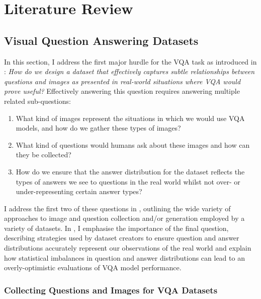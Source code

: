 \chapter{Literature Review}
\label{chapter:literature}

\section{Visual Question Answering Datasets}
\label{section:vqa_datasets}

In this section, I address the first major hurdle for the VQA task as introduced in \chapterautorefname{  \ref{chapter:introduction}}: \textit{How do we design a dataset that effectively captures subtle relationships between questions and images as presented in real-world situations where VQA would prove useful?} Effectively answering this question requires answering multiple related sub-questions:

\begin{enumerate}
    \item What kind of images represent the situations in which we would use VQA models, and how do we gather these types of images?
    \item What kind of questions would humans ask about these images and how can they be collected?
    \item How do we ensure that the answer distribution for the dataset reflects the types of answers we see to questions in the real world whilst not over- or under-representing certain answer types?
\end{enumerate}

I address the first two of these questions in \subsectionautorefname{ \ref{subsection:question_and_image_collection}}, outlining the wide variety of approaches to image and question collection and/or generation employed by a variety of datasets. In \subsectionautorefname{ \ref{subsec:lanauge_priors_in_vqa_datasets}}, I emphasise the importance of the final question, describing strategies used by dataset creators to ensure question and answer distributions accurately represent our observations of the real world and explain how statistical imbalances in question and answer distributions can lead to an overly-optimistic evaluations of VQA model performance.

\subsection{Collecting Questions and Images for VQA Datasets}
\label{subsection:question_and_image_collection}

